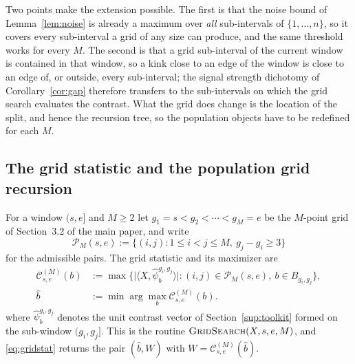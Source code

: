\documentclass[12pt, a4paper]{article}
\begin{document}
Two points make the extension possible. The first is that the noise bound of
Lemma~\ref{lem:noise} is already a maximum over \emph{all} sub-intervals of
$\{1,\ldots,n\}$, so it covers every sub-interval a grid of any size can
produce, and the same threshold works for every $M$. The second is that a grid
sub-interval of the current window is contained in that window, so a kink close
to an edge of the window is close to an edge of, or outside, every sub-interval;
the signal strength dichotomy of Corollary~\ref{cor:gap} therefore transfers to the
sub-intervals on which the grid search evaluates the contrast. What the grid
does change is the location of the split, and hence the recursion tree, so the
population objects have to be redefined for each $M$.

\subsection{The grid statistic and the population grid recursion}
\label{sup:gridpop}

For a window $(s,e]$ and $M \ge 2$ let $g_1 = s < g_2 < \cdots < g_M = e$ be
the $M$-point grid of Section~3.2 of the main paper, and write
\[
\mathcal{P}_M(s,e) := \big\{ (i,j) : 1 \le i < j \le M, \ g_j - g_i \ge 3 \big\}
\]
for the admissible pairs. The grid statistic and its maximizer are
\begin{equation}
\label{eq:gridstat}
\begin{aligned}
\mathcal{C}^{(M)}_{s,e}(b)
&:= \max\big\{ \big| \langle X, \hat\psi^{g_i,g_j}_b \rangle \big| :
 (i,j) \in \mathcal{P}_M(s,e), \ b \in B_{g_i,g_j} \big\}, \\
\hat b &:= \min\arg\max_b \mathcal{C}^{(M)}_{s,e}(b).
\end{aligned}
\end{equation}
where $\hat\psi^{g_i,g_j}_b$ denotes the unit contrast vector of
Section~\ref{sup:toolkit} formed on the sub-window $(g_i,g_j]$. This is the
routine $\textsc{GridSearch}(X,s,e,M)$, and \eqref{eq:gridstat} returns the
pair $(\hat b, W)$ with $W = \mathcal{C}^{(M)}_{s,e}(\hat b)$.
\end{document}
